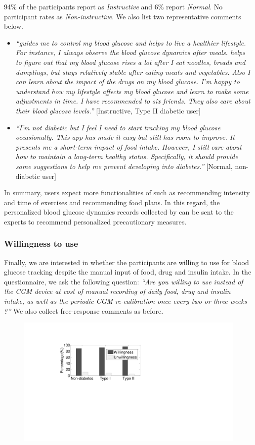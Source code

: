 {94\% of the participants report \sysname as \textit{Instructive} and 6\% report \textit{Normal}.
No participant rates \sysname as \textit{Non-instructive}.
We also list two representative comments below.
\begin{itemize}
  \item
  \textit{``\sysname guides me to control my blood glucose and helps to live a healthier lifestyle.
  For instance, I always observe the blood glucose dynamics after meals.
  \sysname helps to figure out that my blood glucose rises a lot after I eat noodles, breads and dumplings, but stays relatively stable after eating meats and vegetables.
  Also I can learn about the impact of the drugs on my blood glucose.
  I'm happy to understand how my lifestyle affects my blood glucose and learn to make some adjustments in time.
  I have recommended \sysname to six friends.
  They also care about their blood glucose levels.''}
  [Instructive, Type II diabetic user]
  \item
  \textit{``I'm not diabetic but I feel I need to start tracking my blood glucose occasionally.
  This app has made it easy but still has room to improve.
  It presents me a short-term impact of food intake.
  However, I still care about how to maintain a long-term healthy status.
  Specifically, it should provide some suggestions to help me prevent developing into diabetes.''}
  [Normal, non-diabetic user]
\end{itemize}
In summary, users expect more functionalities of \sysname such as recommending intensity and time of exercises and recommending food plans.
In this regard, the personalized blood glucose dynamics records collected by \sysname can be sent to the experts to recommend personalized precautionary measures.

\subsubsection{Willingness to use \sysname}
Finally, we are interested in whether the participants are willing to use \sysname for blood glucose tracking despite the manual input of food, drug and insulin intake.
In the questionnaire, we ask the following question:
\textit{``Are you willing to use \sysname instead of the CGM device at cost of manual recording of daily food, drug and insulin intake, as well as the periodic CGM re-calibration once every two or three weeks ?''}
We also collect free-response comments as before.
\begin{figure}[h]
  \centering
  \includegraphics[width=0.4\columnwidth]{./img/willingness.pdf}
  \caption{}
  \label{fig:user_willingness}
\end{figure}

}
